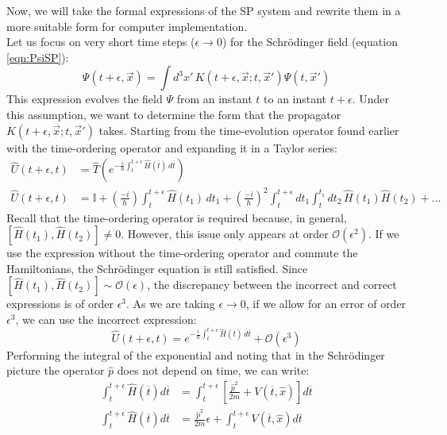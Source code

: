 \documentclass[12pt]{article}
\begin{document}
Now, we will take the formal expressions of the SP system and rewrite them in a more suitable form for computer implementation. \\
Let us focus on very short time steps ($\epsilon \rightarrow 0$) for the Schrödinger field (equation \ref{eqn:PsiSP}):
\begin{equation}
    \Psi(t+\epsilon,\vec{x})=\int d^{3}x' \, K(t+\epsilon,\vec{x};t,\vec{x}')\Psi(t,\vec{x}')
\end{equation}
This expression evolves the field $\Psi$ from an instant $t$ to an instant $t+\epsilon$. Under this assumption, we want to determine the form that the propagator $K(t+\epsilon,\vec{x};t,\vec{x}')$ takes. Starting from the time-evolution operator found earlier with the time-ordering operator and expanding it in a Taylor series:
\begin{align}
    \hat{U}(t+\epsilon,t)&=\hat{T}\left(e^{-\frac{i}{\hbar}\int_{t}^{t+\epsilon}\hat{H}(\overline{t})\,d\overline{t}} \right) \\
    \hat{U}(t+\epsilon,t)&=\mathbb{I}+\left(\frac{-i}{\hbar} \right)\int_{t}^{t+\epsilon}\hat{H}(t_1)\, dt_1+\left(\frac{-i}{\hbar} \right)^2\int_{t}^{t+\epsilon}dt_{1}\int_{t}^{t_{1}}dt_{2} \, \hat{H}(t_{1})\hat{H}(t_{2})+...
\end{align}
Recall that the time-ordering operator is required because, in general, $[\hat{H}(t_1),\hat{H}(t_2)]\neq 0$. However, this issue only appears at order $\mathcal{O}(\epsilon^2)$. If we use the expression without the time-ordering operator and commute the Hamiltonians, the Schrödinger equation is still satisfied. Since $[\hat{H}(t_1),\hat{H}(t_2)]\sim \mathcal{O}(\epsilon)$, the discrepancy between the incorrect and correct expressions is of order $\epsilon^3$. As we are taking $\epsilon \rightarrow 0$, if we allow for an error of order $\epsilon^3$, we can use the incorrect expression:
\begin{equation}
    \hat{U}(t+\epsilon,t)=e^{-\frac{i}{\hbar}\int_{t}^{t+\epsilon}\hat{H}(\overline{t}) \, d\overline{t}}+\mathcal{O}(\epsilon^3)
\end{equation}
Performing the integral of the exponential and noting that in the Schrödinger picture the operator $\hat{p}$ does not depend on time, we can write:
\begin{align}
    \int_{t}^{t+\epsilon}\hat{H}(\overline{t})d\overline{t}&=\int_{t}^{t+\epsilon}\left[\frac{\hat{p}^2}{2m}+V(\overline{t},\hat{x}) \right] d\overline{t} \\
    \int_{t}^{t+\epsilon}\hat{H}(\overline{t})d\overline{t}&=\frac{\hat{p}^2}{2m}\epsilon +\int_{t}^{t+\epsilon}V(\overline{t},\hat{x})d\overline{t}
\end{align}
\end{document}
